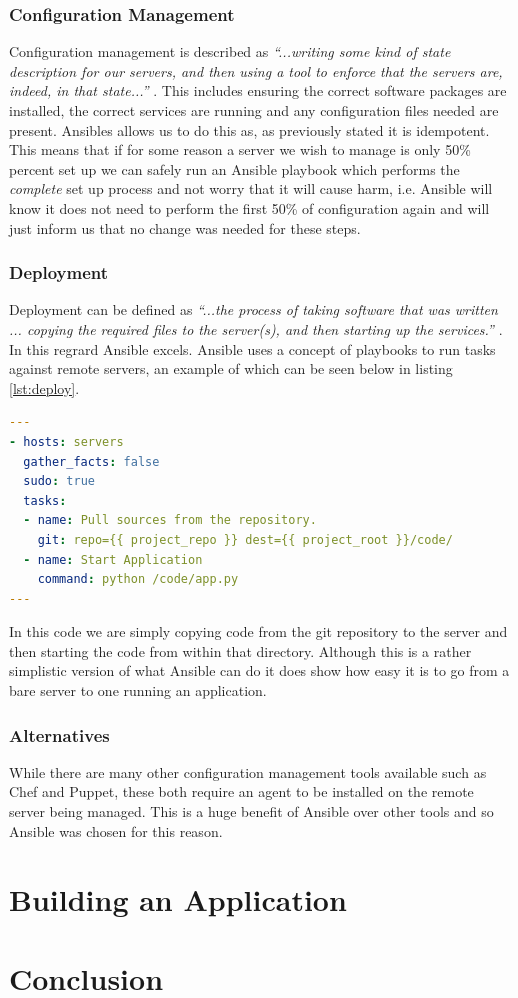 \documentclass{article}
\begin{document}
\subsubsection{Configuration Management}
Configuration management is described as \textit{``...writing some kind of state description for our servers, and then using a tool to enforce that the servers are, indeed, in that state...''} \citep{Hochstein2015}. This includes ensuring the correct software packages are installed, the correct services are running and any configuration files needed are present. Ansibles allows us to do this as, as previously stated it is idempotent. This means that if for some reason a server we wish to manage is only 50\% percent set up we can safely run an Ansible playbook which performs the \textit{complete} set up process and not worry that it will cause harm, i.e. Ansible will know it does not need to perform the first 50\% of configuration again and will just inform us that no change was needed for these steps.

\subsubsection{Deployment}
Deployment can be defined as \textit{``...the process of taking software that was written ... copying the required files to the server(s), and then starting up the services.''} \citep{Hochstein2015}. In this regrard Ansible excels. Ansible uses a concept of playbooks to run tasks against remote servers, an example of which can be seen below in listing \ref{lst:deploy}.

\begin{lstlisting}[float,floatplacement=H,language=yaml,caption={A Simple Playbook To Deploy and Run Code},label={lst:deploy}]
---
- hosts: servers
  gather_facts: false
  sudo: true
  tasks:
  - name: Pull sources from the repository.
    git: repo={{ project_repo }} dest={{ project_root }}/code/
  - name: Start Application
    command: python /code/app.py
---
\end{lstlisting}

In this code we are simply copying code from the git repository to the server and then starting the code from within that directory. Although this is a rather simplistic version of what Ansible can do it does show how easy it is to go from a bare server to one running an application.


\subsubsection{Alternatives}
\label{subs:Ansible-alt}
While there are many other configuration management tools available such as Chef and Puppet, these both require an agent to be installed on the remote server being managed. This is a huge benefit of Ansible over other tools and so Ansible was chosen for this reason. 
\newpage
\section{Building an Application}
\label{sec:Build}

\newpage
\section{Conclusion}
\label{sec:Conclusion}

\newpage

\end{document}

